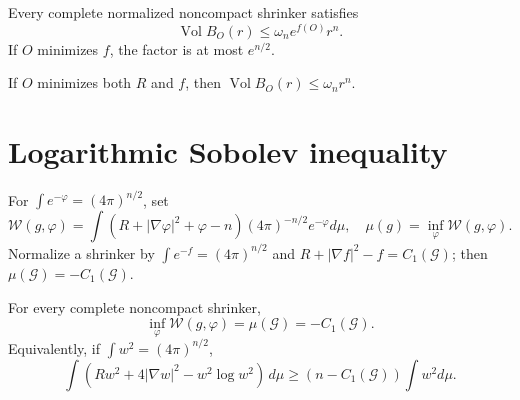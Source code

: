 \begin{theorem}
\label{thm:chow-iv-euclidean-volume-growth}


Every complete normalized noncompact shrinker satisfies
\[
\operatorname{Vol}B_O(r)\le\omega_ne^{f(O)}r^n.
\]
If $O$ minimizes $f$, the factor is at most $e^{n/2}$.
\end{theorem}

\begin{remark}
\label{rem:chow-iv-volume-at-scalar-minimum}

If $O$ minimizes both $R$ and $f$, then $\operatorname{Vol}B_O(r)\le\omega_nr^n$.
\end{remark}

\section{Logarithmic Sobolev inequality}

\begin{definition}
\label{def:chow-iv-shrinker-entropy}

For $\int e^{-\varphi}=(4\pi)^{n/2}$, set
\[
\mathcal W(g,\varphi)=\int(R+|\nabla\varphi|^2+\varphi-n)(4\pi)^{-n/2}e^{-\varphi}d\mu,
\quad \mu(g)=\inf_\varphi\mathcal W(g,\varphi).
\]
Normalize a shrinker by $\int e^{-f}=(4\pi)^{n/2}$ and
$R+|\nabla f|^2-f=C_1(\mathcal G)$; then $\mu(\mathcal G)=-C_1(\mathcal G)$.
\end{definition}

\begin{theorem}
\label{thm:chow-iv-sharp-log-sobolev}


For every complete noncompact shrinker,
\[
\inf_\varphi\mathcal W(g,\varphi)=\mu(\mathcal G)=-C_1(\mathcal G).
\]
Equivalently, if $\int w^2=(4\pi)^{n/2}$,
\[
\int(Rw^2+4|\nabla w|^2-w^2\log w^2)\,d\mu
\ge(n-C_1(\mathcal G))\int w^2d\mu.
\]
\end{theorem}

